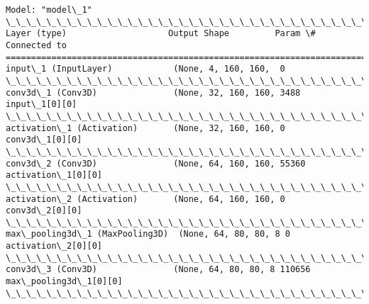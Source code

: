 \documentclass[11pt]{article}
\begin{document}
    \begin{Verbatim}[commandchars=\\\{\}]
Model: "model\_1"
\_\_\_\_\_\_\_\_\_\_\_\_\_\_\_\_\_\_\_\_\_\_\_\_\_\_\_\_\_\_\_\_\_\_\_\_\_\_\_\_\_\_\_\_\_\_\_\_\_\_\_\_\_\_\_\_\_\_\_\_\_\_\_\_\_\_\_\_\_\_\_\_\_\_\_\_\_\_\_\_\_\_\_\_\_\_\_\_\_\_\_\_\_\_\_\_\_\_
Layer (type)                    Output Shape         Param \#     Connected to                     
==================================================================================================
input\_1 (InputLayer)            (None, 4, 160, 160,  0                                            
\_\_\_\_\_\_\_\_\_\_\_\_\_\_\_\_\_\_\_\_\_\_\_\_\_\_\_\_\_\_\_\_\_\_\_\_\_\_\_\_\_\_\_\_\_\_\_\_\_\_\_\_\_\_\_\_\_\_\_\_\_\_\_\_\_\_\_\_\_\_\_\_\_\_\_\_\_\_\_\_\_\_\_\_\_\_\_\_\_\_\_\_\_\_\_\_\_\_
conv3d\_1 (Conv3D)               (None, 32, 160, 160, 3488        input\_1[0][0]                    
\_\_\_\_\_\_\_\_\_\_\_\_\_\_\_\_\_\_\_\_\_\_\_\_\_\_\_\_\_\_\_\_\_\_\_\_\_\_\_\_\_\_\_\_\_\_\_\_\_\_\_\_\_\_\_\_\_\_\_\_\_\_\_\_\_\_\_\_\_\_\_\_\_\_\_\_\_\_\_\_\_\_\_\_\_\_\_\_\_\_\_\_\_\_\_\_\_\_
activation\_1 (Activation)       (None, 32, 160, 160, 0           conv3d\_1[0][0]                   
\_\_\_\_\_\_\_\_\_\_\_\_\_\_\_\_\_\_\_\_\_\_\_\_\_\_\_\_\_\_\_\_\_\_\_\_\_\_\_\_\_\_\_\_\_\_\_\_\_\_\_\_\_\_\_\_\_\_\_\_\_\_\_\_\_\_\_\_\_\_\_\_\_\_\_\_\_\_\_\_\_\_\_\_\_\_\_\_\_\_\_\_\_\_\_\_\_\_
conv3d\_2 (Conv3D)               (None, 64, 160, 160, 55360       activation\_1[0][0]               
\_\_\_\_\_\_\_\_\_\_\_\_\_\_\_\_\_\_\_\_\_\_\_\_\_\_\_\_\_\_\_\_\_\_\_\_\_\_\_\_\_\_\_\_\_\_\_\_\_\_\_\_\_\_\_\_\_\_\_\_\_\_\_\_\_\_\_\_\_\_\_\_\_\_\_\_\_\_\_\_\_\_\_\_\_\_\_\_\_\_\_\_\_\_\_\_\_\_
activation\_2 (Activation)       (None, 64, 160, 160, 0           conv3d\_2[0][0]                   
\_\_\_\_\_\_\_\_\_\_\_\_\_\_\_\_\_\_\_\_\_\_\_\_\_\_\_\_\_\_\_\_\_\_\_\_\_\_\_\_\_\_\_\_\_\_\_\_\_\_\_\_\_\_\_\_\_\_\_\_\_\_\_\_\_\_\_\_\_\_\_\_\_\_\_\_\_\_\_\_\_\_\_\_\_\_\_\_\_\_\_\_\_\_\_\_\_\_
max\_pooling3d\_1 (MaxPooling3D)  (None, 64, 80, 80, 8 0           activation\_2[0][0]               
\_\_\_\_\_\_\_\_\_\_\_\_\_\_\_\_\_\_\_\_\_\_\_\_\_\_\_\_\_\_\_\_\_\_\_\_\_\_\_\_\_\_\_\_\_\_\_\_\_\_\_\_\_\_\_\_\_\_\_\_\_\_\_\_\_\_\_\_\_\_\_\_\_\_\_\_\_\_\_\_\_\_\_\_\_\_\_\_\_\_\_\_\_\_\_\_\_\_
conv3d\_3 (Conv3D)               (None, 64, 80, 80, 8 110656      max\_pooling3d\_1[0][0]            
\_\_\_\_\_\_\_\_\_\_\_\_\_\_\_\_\_\_\_\_\_\_\_\_\_\_\_\_\_\_\_\_\_\_\_\_\_\_\_\_\_\_\_\_\_\_\_\_\_\_\_\_\_\_\_\_\_\_\_\_\_\_\_\_\_\_\_\_\_\_\_\_\_\_\_\_\_\_\_\_\_\_\_\_\_\_\_\_\_\_\_\_\_\_\_\_\_\_

\end{Verbatim}
\end{document}
